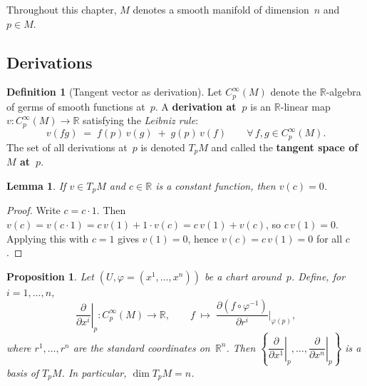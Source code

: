 \documentclass[12pt,a4paper,openany]{book}
\newtheorem{proposition}[theorem]{Proposition}
\newtheorem{lemma}[theorem]{Lemma}
\theoremstyle{definition}
\newtheorem{definition}[theorem]{Definition}
\theoremstyle{remark}
\newcommand{\R}{\mathbb{R}}
\begin{document}
Throughout this chapter, $M$ denotes a smooth manifold of dimension~$n$
and $p \in M$.

\subsection{Derivations}\label{ssec:derivations}

\begin{definition}[Tangent vector as derivation]\label{def:derivation}%
Let $C^\infty_p(M)$ denote the $\R$-algebra of germs of smooth
functions at~$p$.  A \textbf{derivation at~$p$} is an $\R$-linear map
$v \colon C^\infty_p(M) \to \R$ satisfying the \emph{Leibniz rule}:
\[
  v(fg) \;=\; f(p)\,v(g) \;+\; g(p)\,v(f)
  \qquad \forall\, f,g \in C^\infty_p(M).
\]
The set of all derivations at~$p$ is denoted $T_pM$
and called the \textbf{tangent space of $M$ at~$p$}.
\end{definition}

\begin{lemma}\label{lem:derivation-constant}
If $v \in T_pM$ and $c \in \R$ is a constant function, then $v(c) = 0$.
\end{lemma}

\begin{proof}
Write $c = c \cdot 1$.  Then $v(c) = v(c \cdot 1) = c\, v(1) + 1 \cdot v(c)
= c\, v(1) + v(c)$, so $c\, v(1) = 0$.  Applying this with $c = 1$ gives
$v(1) = 0$, hence $v(c) = c\, v(1) = 0$ for all $c$.
\end{proof}

\begin{proposition}\label{prop:tangent-space-basis}%
Let $(U, \varphi = (x^1, \dots, x^n))$ be a chart around~$p$.  Define, for
$i = 1, \dots, n$,
\[
  \left.\frac{\partial}{\partial x^i}\right|_p \colon C^\infty_p(M) \to \R,
  \qquad
  f \;\longmapsto\;
  \frac{\partial (f \circ \varphi^{-1})}{\partial r^i}\bigg|_{\varphi(p)},
\]
where $r^1, \dots, r^n$ are the standard coordinates on~$\R^n$.  Then
$\left\{\left.\dfrac{\partial}{\partial x^1}\right|_p, \dots,
\left.\dfrac{\partial}{\partial x^n}\right|_p\right\}$
is a basis of $T_pM$.  In particular, $\dim T_pM = n$.
\end{proposition}
\end{document}
